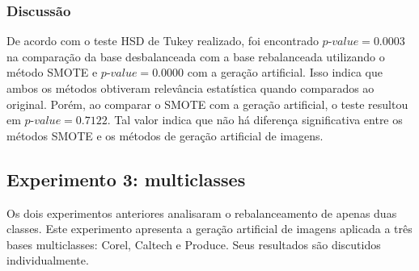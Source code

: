 
\subsubsection{Discussão}

De acordo com o teste HSD de Tukey realizado, foi encontrado $\textit{p-value} = 0.0003$ na comparação da base desbalanceada com a base rebalanceada utilizando o método SMOTE e $\textit{p-value} = 0.0000$ com a geração artificial. Isso indica que ambos os métodos obtiveram relevância estatística quando comparados ao original. Porém, ao comparar o SMOTE com a geração artificial, o teste resultou em $\textit{p-value} = 0.7122$. Tal valor indica que não há diferença significativa entre os métodos SMOTE e os métodos de geração artificial de imagens.



\FloatBarrier
\subsection{Experimento 3: multiclasses}

Os dois experimentos anteriores analisaram o rebalanceamento de apenas duas classes. Este experimento apresenta a geração artificial de imagens aplicada a três bases multiclasses: Corel, Caltech e Produce. Seus resultados são discutidos individualmente.

